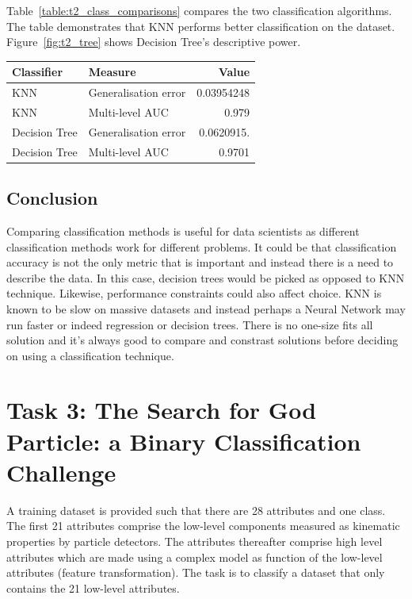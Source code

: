 \documentclass[11pt]{article}
\begin{document}
Table~\ref{table:t2_class_comparisons} compares the two classification algorithms. The table demonstrates that KNN performs better classification on the dataset. Figure~\ref{fig:t2_tree} shows Decision Tree's descriptive power.

 \begin{center}   
 \begin{tabular}{@{}llr@{}}
	\toprule[1.5pt]
	Classifier & Measure & Value \\
	\toprule[1.5pt]
	KNN & Generalisation error & 0.03954248\\ \midrule
	KNN & Multi-level AUC & 0.979 \\ \midrule
        Decision Tree & Generalisation error & 0.0620915.\\ \midrule
	Decision Tree & Multi-level AUC & 0.9701 \\
	\bottomrule[1.25pt]
    \end{tabular}
 \label{table:t2_class_comparisons}
 \end{center}

 \subsection{Conclusion}
 Comparing classification methods is useful for data scientists as different classification methods work for different problems. It could be that classification accuracy is not the only metric that is important and instead there is a need to describe the data. In this case, decision trees would be picked as opposed to KNN technique. Likewise, performance constraints could also affect choice. KNN is known to be slow on massive datasets and instead perhaps a Neural Network may run faster or indeed regression or decision trees. There is no one-size fits all solution and it's always good to compare and constrast solutions before deciding on using a classification technique.

\pagebreak
\section{Task 3: The Search for God Particle: a Binary Classification Challenge}
A training dataset is provided such that there are 28 attributes and one class. The first 21 attributes comprise the low-level components measured as kinematic properties by particle detectors. The attributes thereafter comprise high level attributes which are made using a complex model as function of the low-level attributes (feature transformation). The task is to classify a dataset that only contains the 21 low-level attributes.
\end{document}
